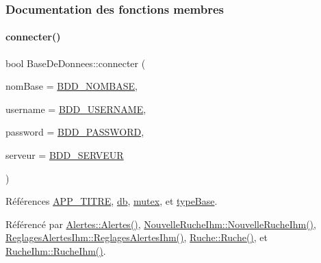 \subsubsection{Documentation des fonctions membres}
\mbox{\label{class_base_de_donnees_ac20da193923a9bfea5e38ee5a54820cd}} 
\paragraph{\texorpdfstring{connecter()}{connecter()}}
{\footnotesize\ttfamily bool Base\+De\+Donnees\+::connecter (\begin{DoxyParamCaption}\item[{Q\+String}]{nom\+Base = {\ttfamily \hyperlink{parametres_8h_a45f8f15b8f9a7ab4c2b219038ff64f6b}{B\+D\+D\+\_\+\+N\+O\+M\+B\+A\+SE}},  }\item[{Q\+String}]{username = {\ttfamily \hyperlink{parametres_8h_a88b5f5b81fa534553c68802384beff2c}{B\+D\+D\+\_\+\+U\+S\+E\+R\+N\+A\+ME}},  }\item[{Q\+String}]{password = {\ttfamily \hyperlink{parametres_8h_ae2ded9166ed2553182545e97514c04f7}{B\+D\+D\+\_\+\+P\+A\+S\+S\+W\+O\+RD}},  }\item[{Q\+String}]{serveur = {\ttfamily \hyperlink{parametres_8h_a423559dc987673b8aacaa9f369839bb0}{B\+D\+D\+\_\+\+S\+E\+R\+V\+E\+UR}} }\end{DoxyParamCaption})}



Références \hyperlink{parametres_8h_ace364d1ce44aa9f79bcff6e3752c4a5f}{A\+P\+P\+\_\+\+T\+I\+T\+RE}, \hyperlink{class_base_de_donnees_a3e738dcf443370c46a541677ab619f06}{db}, \hyperlink{class_base_de_donnees_aa1b4696fac87a740f914aa73739086f2}{mutex}, et \hyperlink{class_base_de_donnees_ab682b82167f494496a6531bfe522b42b}{type\+Base}.



Référencé par \hyperlink{class_alertes_ad2e4e3907f97bdd06840dfeee0a87ddb}{Alertes\+::\+Alertes()}, \hyperlink{class_nouvelle_ruche_ihm_a338b9af0b96ed0839a8d5008c8c89cc4}{Nouvelle\+Ruche\+Ihm\+::\+Nouvelle\+Ruche\+Ihm()}, \hyperlink{class_reglages_alertes_ihm_ae6337f2d05a3184e48bf5022a91f06c7}{Reglages\+Alertes\+Ihm\+::\+Reglages\+Alertes\+Ihm()}, \hyperlink{class_ruche_a8b4ee3752d984c5acee93b990db7939a}{Ruche\+::\+Ruche()}, et \hyperlink{class_ruche_ihm_a04c2544ba4e9cca6c38f553c32d63dee}{Ruche\+Ihm\+::\+Ruche\+Ihm()}.


